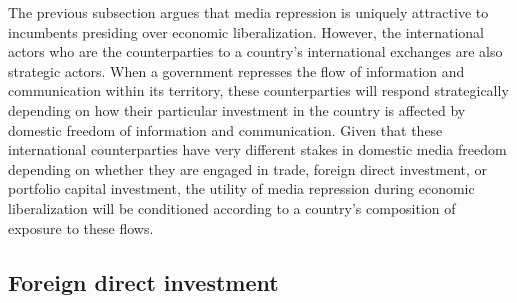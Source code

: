 \documentclass[12pt,a4paper]{article}\usepackage[]{graphicx}\usepackage[]{color}
\begin{document}
The previous subsection argues that media repression is uniquely attractive to incumbents presiding over economic liberalization. However, the international actors who are the counterparties to a country's international exchanges are also strategic actors. When a government represses the flow of information and communication within its territory, these counterparties will respond strategically depending on how their particular investment in the country is affected by domestic freedom of information and communication. Given that these international counterparties have very different stakes in domestic media freedom depending on whether they are engaged in trade, foreign direct investment, or portfolio capital investment, the utility of media repression during economic liberalization will be conditioned according to a country's composition of exposure to these flows.

\subsection{Foreign direct investment}
\end{document}
